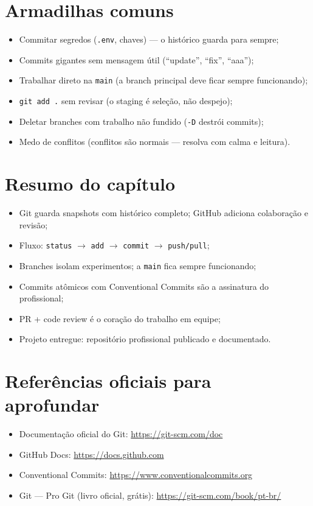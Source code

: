 \section{Armadilhas comuns}

\begin{itemize}[leftmargin=*, itemsep=0.4em]
  \item Commitar segredos (\texttt{.env}, chaves) — o histórico guarda para sempre;
  \item Commits gigantes sem mensagem útil (``update'', ``fix'', ``aaa'');
  \item Trabalhar direto na \texttt{main} (a branch principal deve ficar sempre funcionando);
  \item \texttt{git add .} sem revisar (o staging é seleção, não despejo);
  \item Deletar branches com trabalho não fundido (\texttt{-D} destrói commits);
  \item Medo de conflitos (conflitos são normais — resolva com calma e leitura).
\end{itemize}

\section{Resumo do capítulo}

\begin{itemize}[leftmargin=*, itemsep=0.3em]
  \item Git guarda snapshots com histórico completo; GitHub adiciona colaboração e revisão;
  \item Fluxo: \texttt{status} $\rightarrow$ \texttt{add} $\rightarrow$ \texttt{commit} $\rightarrow$ \texttt{push/pull};
  \item Branches isolam experimentos; a \texttt{main} fica sempre funcionando;
  \item Commits atômicos com Conventional Commits são a assinatura do profissional;
  \item PR + code review é o coração do trabalho em equipe;
  \item Projeto entregue: repositório profissional publicado e documentado.
\end{itemize}

\section{Referências oficiais para aprofundar}

\begin{itemize}[leftmargin=*, itemsep=0.3em]
  \item Documentação oficial do Git: \url{https://git-scm.com/doc}
  \item GitHub Docs: \url{https://docs.github.com}
  \item Conventional Commits: \url{https://www.conventionalcommits.org}
  \item Git — Pro Git (livro oficial, grátis): \url{https://git-scm.com/book/pt-br/}
\end{itemize}
